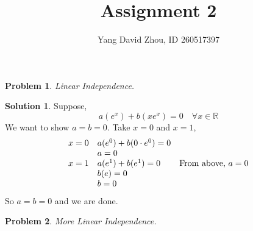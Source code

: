 \documentclass{article}
\newtheorem{problem}{Problem}
\theoremstyle{definition}
\newtheorem*{solution}{Solution}
\begin{document}
 \title{Assignment 2} 

\author{Yang David Zhou, ID 260517397} 
\date{}
\maketitle

\begin{problem} Linear Independence.

\end{problem}

\begin{solution}

Suppose,
\[a(e^x)+b(xe^x)=0 \quad \forall x\in \mathbb{R}\]
We want to show $a=b=0$.
Take $x=0$ and $x=1$,
\[\begin{array}{l l l}
x=0 & a(e^0)+b(0\cdot e^0)=0 \\
& a=0 \\
x=1 & a(e^1)+b(e^1)=0 & \text{From above, }a=0\\
& b(e)=0 \\
& b=0
\end{array}\]
So $a=b=0$ and we are done.

\end{solution}

\begin{problem} More Linear Independence.

\end{problem}
\end{document}
